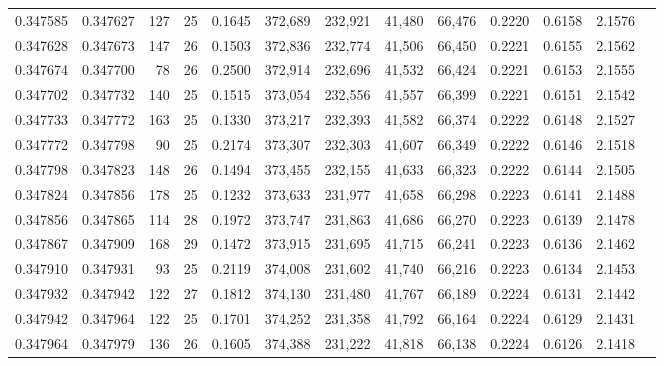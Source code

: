 \begin{tabular}{rrrrrrrrrrrrr}
0.347585 & 0.347627 &   127 &  25 &                                     0.1645 & 372,689 & 232,921 &  41,480 &  66,476 & 0.2220 & 0.6158 & 2.1576 \\
0.347628 & 0.347673 &   147 &  26 &                                     0.1503 & 372,836 & 232,774 &  41,506 &  66,450 & 0.2221 & 0.6155 & 2.1562 \\
0.347674 & 0.347700 &    78 &  26 &                                     0.2500 & 372,914 & 232,696 &  41,532 &  66,424 & 0.2221 & 0.6153 & 2.1555 \\
0.347702 & 0.347732 &   140 &  25 &                                     0.1515 & 373,054 & 232,556 &  41,557 &  66,399 & 0.2221 & 0.6151 & 2.1542 \\
0.347733 & 0.347772 &   163 &  25 &                                     0.1330 & 373,217 & 232,393 &  41,582 &  66,374 & 0.2222 & 0.6148 & 2.1527 \\
0.347772 & 0.347798 &    90 &  25 &                                     0.2174 & 373,307 & 232,303 &  41,607 &  66,349 & 0.2222 & 0.6146 & 2.1518 \\
0.347798 & 0.347823 &   148 &  26 &                                     0.1494 & 373,455 & 232,155 &  41,633 &  66,323 & 0.2222 & 0.6144 & 2.1505 \\
0.347824 & 0.347856 &   178 &  25 &                                     0.1232 & 373,633 & 231,977 &  41,658 &  66,298 & 0.2223 & 0.6141 & 2.1488 \\
0.347856 & 0.347865 &   114 &  28 &                                     0.1972 & 373,747 & 231,863 &  41,686 &  66,270 & 0.2223 & 0.6139 & 2.1478 \\
0.347867 & 0.347909 &   168 &  29 &                                     0.1472 & 373,915 & 231,695 &  41,715 &  66,241 & 0.2223 & 0.6136 & 2.1462 \\
0.347910 & 0.347931 &    93 &  25 &                                     0.2119 & 374,008 & 231,602 &  41,740 &  66,216 & 0.2223 & 0.6134 & 2.1453 \\
0.347932 & 0.347942 &   122 &  27 &                                     0.1812 & 374,130 & 231,480 &  41,767 &  66,189 & 0.2224 & 0.6131 & 2.1442 \\
0.347942 & 0.347964 &   122 &  25 &                                     0.1701 & 374,252 & 231,358 &  41,792 &  66,164 & 0.2224 & 0.6129 & 2.1431 \\
0.347964 & 0.347979 &   136 &  26 &                                     0.1605 & 374,388 & 231,222 &  41,818 &  66,138 & 0.2224 & 0.6126 & 2.1418 \\

\end{tabular}

